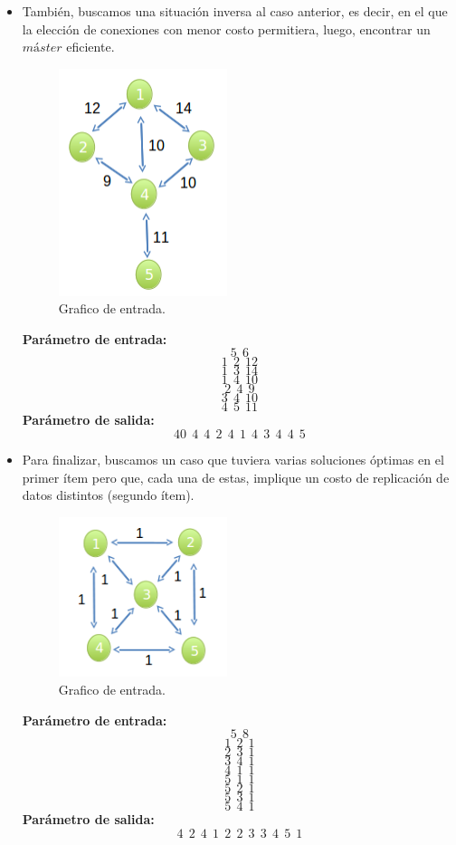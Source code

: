 \begin{itemize}
\item También, buscamos una situación inversa al caso anterior, es decir, en el que la elección de conexiones con menor costo permitiera, luego, encontrar un $máster$ eficiente.\newline
\begin{figure}[H] %
\begin{center}
\includegraphics[width=140pt]{../imgs/caso2-ej2.png}
\end{center}
\caption{Grafico de entrada.}
\end{figure}
\textbf{Parámetro de entrada:} $$5\ \  6$$
$$1\ \  2\ \  12$$
$$1\ \  3\ \ 14$$
$$1\ \  4\ \  10$$
$$2\ \  4\ \ 9$$
$$3\ \  4\ \  10$$
$$4\ \  5\ \ 11$$
\textbf{Parámetro de salida:} $$40\ \ 4\ \ 4\ \ 2\ \ 4\ \ 1\ \ 4\ \ 3\ \ 4\ \ 4\ \ 5$$

\item Para finalizar, buscamos un caso que tuviera varias soluciones óptimas en el primer ítem pero que, cada una de estas, implique un costo de replicación de datos distintos (segundo ítem).\newline
\begin{figure}[H] %
\begin{center}
\includegraphics[width=140pt]{../imgs/caso3-ej2.png}
\end{center}
\caption{Grafico de entrada.}
\end{figure}
\textbf{Parámetro de entrada:} $$5\ \ 8$$
$$1\ \ 2\ \ 1$$
$$2\ \ 3\ \ 1$$
$$3\ \ 4\ \ 1$$
$$4\ \ 1\ \ 1$$
$$5\ \ 1\ \ 1$$
$$5\ \ 2\ \ 1$$
$$5\ \ 3\ \ 1$$
$$5\ \ 4\ \ 1$$
\textbf{Parámetro de salida:} $$4\ \ 2\ \ 4\ \ 1\ \ 2\ \ 2\ \ 3\ \ 3\ \ 4\ \ 5\ \ 1$$

\end{itemize}

